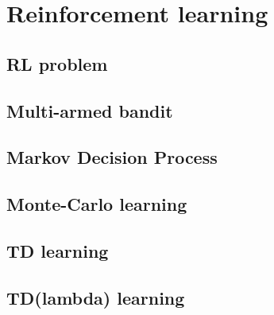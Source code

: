 \chapter{Reinforcement learning}
\label{chap:reinforcement}


\section{RL problem}



\section{Multi-armed bandit}



\section{Markov Decision Process}



\section{Monte-Carlo learning}



\section{TD learning}



\section{TD(lambda) learning}




